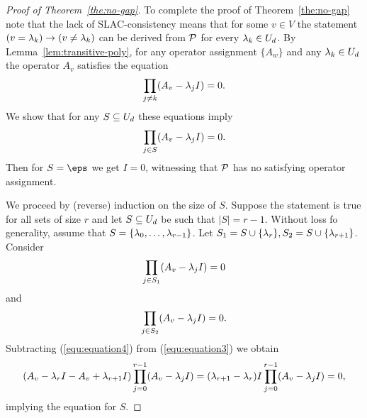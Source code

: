\begin{proof}[Proof of Theorem~\ref{the:no-gap}]
To complete the proof of Theorem~\ref{the:no-gap} note that the lack of
SLAC-consistency means that for some $v\in V$ the statement 
$(v=\lambda_k)\to(v\ne\lambda_k)$ can be derived from ${\mathcal P}$ for every $\lambda_k\in U_d$.
By Lemma~\ref{lem:transitive-poly}, for any operator assignment $\{A_w\}$
and any $\lambda_k\in U_d$ the operator $A_v$ satisfies the equation
\[
\prod_{j\ne k}(A_v-\lambda_jI)=0.
\]
We show that for any $S\subseteq U_d$ these equations imply 
\[
\prod_{j\in S}(A_v-\lambda_jI)=0.
\]
Then for $S=\eps$ we get $I=0$, witnessing that ${\mathcal P}$ has no satisfying 
operator assignment.

We proceed by (reverse) induction on the size of $S$. Suppose the statement is true 
for all sets of size $r$ and let $S\subseteq U_d$ be such that $|S|=r-1$. Without loss fo
generality, assume that
$S=\{\lambda_0,\ldots,\lambda_{r-1}\}$. Let $S_1=S\cup\{\lambda_r\}, S_2=S\cup\{\lambda_{r+1}\}$.
Consider
\begin{equation}\label{equ:equation3}
\prod_{j\in S_1}(A_v-\lambda_jI)=0
\end{equation}
and
\begin{equation}\label{equ:equation4}
\prod_{j\in S_2}(A_v-\lambda_jI)=0.
\end{equation}
Subtracting (\ref{equ:equation4}) from (\ref{equ:equation3}) we obtain
\[
(A_v-\lambda_rI-A_v+\lambda_{r+1}I)\prod_{j=0}^{r-1}(A_v-\lambda_jI)=
(\lambda_{r+1}-\lambda_r)I\prod_{j=0}^{r-1}(A_v-\lambda_jI)=0,
\]
implying the equation for $S$.
\end{proof}
